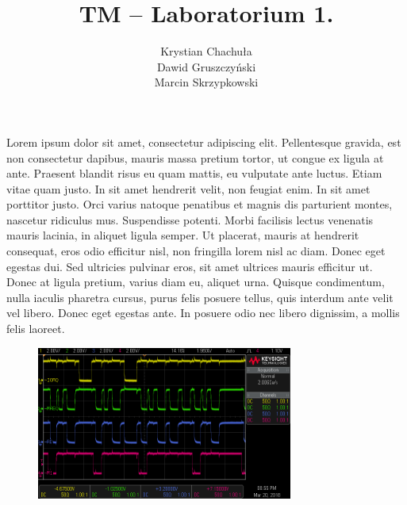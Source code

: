 \documentclass[fleqn]{article}
\title{TM -- Laboratorium 1.}
\author{Krystian Chachuła \\ Dawid Gruszczyński \\ Marcin Skrzypkowski}
\begin{document}
\maketitle

\setcounter{page}{0}
\thispagestyle{empty}

\pagebreak

\setcounter{page}{1}

\section{} %

Lorem ipsum dolor sit amet, consectetur adipiscing elit. Pellentesque gravida, est non consectetur dapibus, mauris massa pretium tortor, ut congue ex ligula at ante. Praesent blandit risus eu quam mattis, eu vulputate ante luctus. Etiam vitae quam justo. In sit amet hendrerit velit, non feugiat enim. In sit amet porttitor justo. Orci varius natoque penatibus et magnis dis parturient montes, nascetur ridiculus mus. Suspendisse potenti. Morbi facilisis lectus venenatis mauris lacinia, in aliquet ligula semper. Ut placerat, mauris at hendrerit consequat, eros odio efficitur nisl, non fringilla lorem nisl ac diam. Donec eget egestas dui. Sed ultricies pulvinar eros, sit amet ultrices mauris efficitur ut. Donec at ligula pretium, varius diam eu, aliquet urna. Quisque condimentum, nulla iaculis pharetra cursus, purus felis posuere tellus, quis interdum ante velit vel libero. Donec eget egestas ante. In posuere odio nec libero dignissim, a mollis felis laoreet.

\begin{figure}[H]
	\centering
	\includegraphics[width=0.75\textwidth]{img/1a.png}
	\caption{}
\end{figure}

\section{} %
\end{document}
